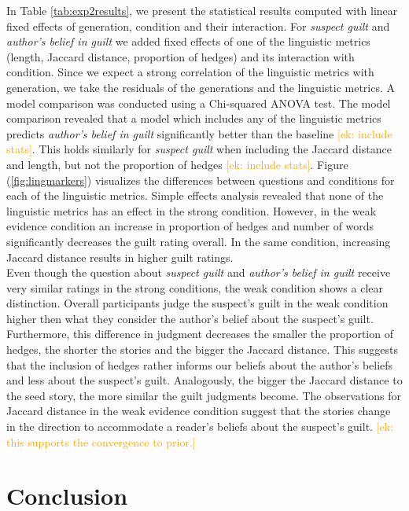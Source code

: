 \documentclass[10pt,letterpaper]{article}
\newcommand{\ek}[1]{\textcolor{Orange}{[ek: #1]}}
\begin{document}
In Table \ref{tab:exp2results}, we present the statistical results computed with linear fixed effects of generation, condition and their interaction. For \textit{suspect guilt} and \textit{author's belief in guilt} we added fixed effects of one of the linguistic metrics (length, Jaccard distance, proportion of hedges) and its interaction with condition. Since we expect a strong correlation of the linguistic metrics with generation, we take the residuals of the generations and the linguistic metrics. A model comparison was conducted using a Chi-squared ANOVA test.
The model comparison revealed that a model which includes any of the linguistic metrics predicts \textit{author's belief in guilt} significantly better than the baseline \ek{include stats}. This holds similarly for \textit{suspect guilt} when including the Jaccard distance and length, but not the proportion of hedges \ek{include stats}. Figure (\ref{fig:lingmarkers}) visualizes the differences between questions and conditions for each of the linguistic metrics. Simple effects analysis revealed that none of the linguistic metrics has an effect in the strong condition. However, in the weak evidence condition an increase in proportion of hedges and number of words significantly decreases the guilt rating overall. In the same condition, increasing Jaccard distance results in higher guilt ratings.\\
Even though the question about \textit{suspect guilt} and \textit{author's belief in guilt} receive very similar ratings in the strong conditions, the weak condition shows a clear distinction. Overall participants judge the suspect's guilt in the weak condition higher then what they consider the author's belief about the suspect's guilt. Furthermore, this difference in judgment decreases the smaller the proportion of hedges, the shorter the stories and the bigger the Jaccard distance. This suggests that the inclusion of hedges rather informs our beliefs about the author's beliefs and less about the suspect's guilt. Analogously, the bigger the Jaccard distance to the seed story, the more similar the guilt judgments become. The observations for Jaccard distance in the weak evidence condition suggest that the stories change in the direction to accommodate a reader's beliefs about the suspect's guilt. \ek{this supports the convergence to prior.}




\section{Conclusion}
\end{document}
